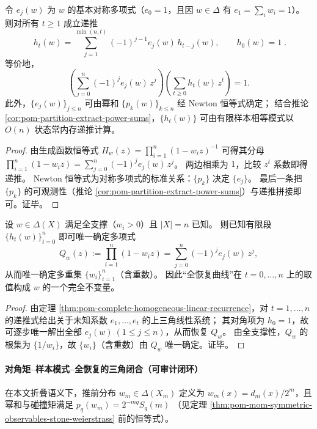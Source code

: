 \begin{theorem}\label{thm:pom-complete-homogeneous-linear-recurrence}
令 \(e_j(w)\) 为 \(w\) 的基本对称多项式（\(e_0=1\)，且因 \(w\in\Delta\) 有 \(e_1=\sum_i w_i=1\)）。
则对所有 \(t\ge1\) 成立递推
\[
\boxed{\;
h_t(w)=\sum_{j=1}^{\min(n,t)}(-1)^{j-1}e_j(w)\,h_{t-j}(w),\qquad h_0(w)=1\; }.
\]
等价地，
\[
\left(\sum_{j=0}^{n}(-1)^j e_j(w)\,z^j\right)\left(\sum_{t\ge0}h_t(w)\,z^t\right)=1.
\]
此外，\(\{e_j(w)\}_{j\le n}\) 可由幂和 \(\{p_k(w)\}_{k\le n}\) 经 Newton 恒等式确定；
结合推论 \ref{cor:pom-partition-extract-power-sums}，\(\{h_t(w)\}\) 可由有限样本相等模式以 \(O(n)\) 状态常内存递推计算。
\end{theorem}
\begin{proof}
由生成函数恒等式
\(
H_w(z)=\prod_{i=1}^n(1-w_i z)^{-1}
\)
可得其分母
\(
\prod_{i=1}^n(1-w_i z)=\sum_{j=0}^n(-1)^j e_j(w)\,z^j
\)。
两边相乘为 \(1\)，比较 \(z^t\) 系数即得递推。
Newton 恒等式为对称多项式的标准关系：\(\{p_k\}\) 决定 \(\{e_j\}\)。
最后一条把 \(\{p_k\}\) 的可观测性（推论 \ref{cor:pom-partition-extract-power-sums}）与递推拼接即可。证毕。
\end{proof}

\begin{theorem}\label{thm:pom-invert-w-from-homogeneous-curve}
设 \(w\in\Delta(X)\) 满足全支撑（\(w_i>0\)）且 \(|X|=n\) 已知。
则已知有限段 \(\{h_t(w)\}_{t=0}^{n}\) 即可唯一确定多项式
\[
Q_w(z):=\prod_{i=1}^n(1-w_i z)=\sum_{j=0}^n(-1)^j e_j(w)\,z^j,
\]
从而唯一确定多重集 \(\{w_i\}_{i=1}^n\)（含重数）。
因此“全恢复曲线”在 \(t=0,\dots,n\) 上的取值构成 \(w\) 的一个完全不变量。
\end{theorem}
\begin{proof}
由定理 \ref{thm:pom-complete-homogeneous-linear-recurrence}，对 \(t=1,\dots,n\) 的递推式给出关于未知系数 \(e_1,\dots,e_t\) 的上三角线性系统；
其对角项为 \(h_0=1\)，故可逐步唯一解出全部 \(e_j(w)\ (1\le j\le n)\)，从而恢复 \(Q_w\)。
由全支撑性，\(Q_w\) 的根集为 \(\{1/w_i\}\)，故 \(\{w_i\}\)（含重数）由 \(Q_w\) 唯一确定。证毕。
\end{proof}

\paragraph{对角矩--样本模式--全恢复的三角闭合（可审计闭环）}
在本文折叠语义下，推前分布 \(w_m\in\Delta(X_m)\) 定义为 \(w_m(x)=d_m(x)/2^m\)，且幂和与碰撞矩满足
\(
p_q(w_m)=2^{-mq}S_q(m)
\)
（见定理 \ref{thm:pom-mom-symmetric-observables-stone-weierstrass} 前的恒等式）。

